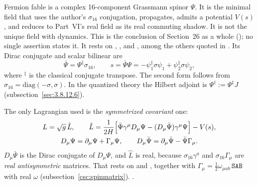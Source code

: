 Fermion fable is a complex 16-component Grassmann spinor $\Psi$. It is the minimal field that uses
the author's $\sigma_{16}$ conjugation, propagates, admits a potential $V(s)$, and reduces to
Part~VI's real field as its real commuting shadow. It is not the unique field with dynamics. This is
the conclusion of Section~26 as a whole (); no single assertion states it. It rests on
 , ,
 and , among the others quoted in . Its
Dirac conjugate and scalar bilinear are
\begin{equation}
  \bar\Psi=\Psi^{\ddagger}\sigma_{16},\qquad
  s=\bar\Psi\Psi=-\psi_1^{\ddagger}\sigma\psi_1+\psi_2^{\ddagger}\sigma\psi_2,
\end{equation}
where ${}^\ddagger$ is the classical conjugate transpose. The second form follows from
$\sigma_{16}=\mathrm{diag}(-\sigma,\sigma)$. In the quantized theory the Hilbert adjoint is
$\Psi^\dagger:=\Psi^\ddagger J$ (subsection~\ref{sec:3.8.12.6}).

The only Lagrangian used is the \emph{symmetrized covariant} one:
\begin{gather}
  L=\sqrt g\,\hat L,\qquad
  \hat L=\frac{1}{2H}\Bigl[\bar\Psi\gamma^\mu D_\mu\Psi-(D_\mu\bar\Psi)\gamma^\mu\Psi\Bigr]-V(s),\label{csc:eq:Lsym}\\
  D_\mu\Psi=\partial_\mu\Psi+\Gamma_\mu\Psi,\qquad
  D_\mu\bar\Psi=\partial_\mu\bar\Psi-\bar\Psi\Gamma_\mu .\notag
\end{gather}
$D_\mu\bar\Psi$ is the Dirac conjugate of $D_\mu\Psi$, and $\hat L$ is real, because
$\sigma_{16}\gamma^a$ and $\sigma_{16}\Gamma_\mu$ are \emph{real antisymmetric} matrices. That rests
on   and
, together with
$\Gamma_\mu=\tfrac12\omega_{\mu ab}\,\texttt{SAB}$ with real $\omega$
(subsection~\ref{csc:spinmatrix}).  .

